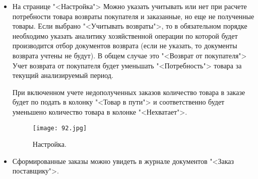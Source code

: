 \begin{itemize}
	\item	На странице "<Настройка"> Можно указать учитывать или нет при расчете потребности товара возвраты покупателя и заказанные, но еще не полученные товары. Если выбрано "<Учитывать возвраты">, то в обязательном порядке необходимо указать аналитику хозяйственной операции по которой будет производится отбор документов возврата (если не указать, то документы возврата учтены не будут). В общем случае это "<Возврат от покупателя">
	Учет возврата от покупателя будет уменьшать "<Потребность"> товара за текущий анализируемый период.\par
	При включенном учете недополученных заказов количество товара в заказе будет по подать в колонку "<Товар в пути"> и соответственно будет уменьшено количество товара в колонке "<Нехватает">.
	
		\begin{figure}[H]
		\texttt{[image: 92.jpg]}
		\caption{Настройка.}
		\label{ris:92.jpg}
	\end{figure}		
	
	\item Сформированные заказы можно увидеть в журнале документов "<Заказ поставщику">. 

\end{itemize}